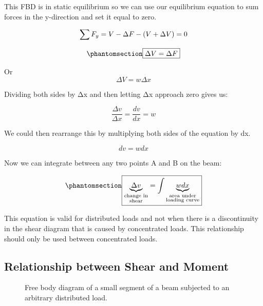 \documentclass[
  letterpaper,
  DIV=11,
  numbers=noendperiod]{scrreprt}
\theoremstyle{definition}
\theoremstyle{remark}
\begin{document}
This FBD is in static equilibrium so we can use our equilibrium equation
to sum forces in the y-direction and set it equal to zero.

\[
\sum F_y=V-\Delta F-(V+\Delta V)=0 \\
\]

\begin{equation}\phantomsection\label{eq-7.1}{
\boxed{\Delta V=\Delta F}
}\end{equation}

Or \[
\Delta V=w\Delta x
\]

Dividing both sides by Δx and then letting Δx approach zero gives us:

\[
\frac{\Delta v}{\Delta x}=\frac{d v}{d x}=w
\]

We could then rearrange this by multiplying both sides of the equation
by dx.

\[
d v=w d x
\]

Now we can integrate between any two points A and B on the beam:

\begin{equation}\phantomsection\label{eq-7.2}{
\boxed{\underbrace{\Delta v}_{\substack{\text{change in} \\ \text{shear}}}=\int\underbrace{w d x}_{\substack{\text{area under} \\ \text {loading curve}}}}
}\end{equation}

This equation is valid for distributed loads and not when there is a
discontinuity in the shear diagram that is caused by concentrated loads.
This relationship should only be used between concentrated loads.

\subsection{Relationship between Shear and
Moment}\label{relationship-between-shear-and-moment}

\begin{figure}


\caption{\label{fig-7.4}Free body diagram of a small segment of a beam
subjected to an arbitrary distributed load.}

\end{figure}%
\end{document}

